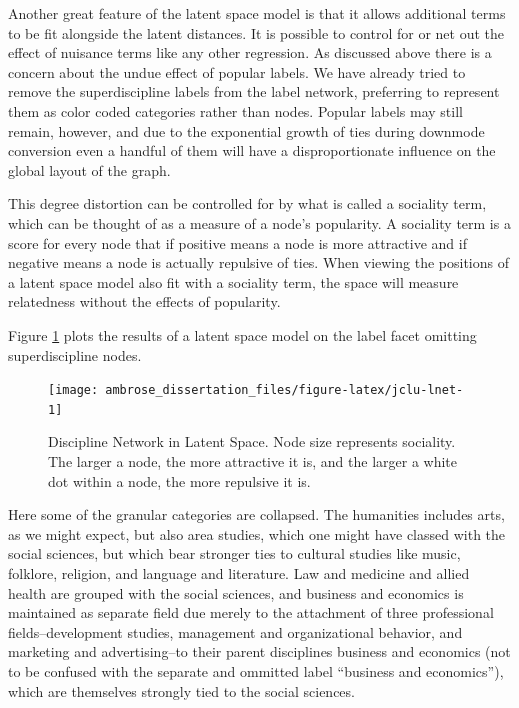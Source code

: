 \documentclass[]{book}
\begin{document}
Another great feature of the latent space model is that it allows
additional terms to be fit alongside the latent distances. It is
possible to control for or net out the effect of nuisance terms like any
other regression. As discussed above there is a concern about the undue
effect of popular labels. We have already tried to remove the
superdiscipline labels from the label network, preferring to represent
them as color coded categories rather than nodes. Popular labels may
still remain, however, and due to the exponential growth of ties during
downmode conversion even a handful of them will have a disproportionate
influence on the global layout of the graph.

This degree distortion can be controlled for by what is called a
sociality term, which can be thought of as a measure of a node's
popularity. A sociality term is a score for every node that if positive
means a node is more attractive and if negative means a node is actually
repulsive of ties. When viewing the positions of a latent space model
also fit with a sociality term, the space will measure relatedness
without the effects of popularity.

Figure \ref{fig:jclu-lnet} plots the results of a latent space model on
the label facet omitting superdiscipline nodes.

\begin{figure}

{\centering \texttt{[image: ambrose\_dissertation\_files/figure-latex/jclu-lnet-1]} 

}

\caption{Discipline Network in Latent Space. Node size represents sociality. The larger a node, the more attractive it is, and the larger a white dot within a node, the more repulsive it is.}\label{fig:jclu-lnet}
\end{figure}

Here some of the granular categories are collapsed. The humanities
includes arts, as we might expect, but also area studies, which one
might have classed with the social sciences, but which bear stronger
ties to cultural studies like music, folklore, religion, and language
and literature. Law and medicine and allied health are grouped with the
social sciences, and business and economics is maintained as separate
field due merely to the attachment of three professional
fields--development studies, management and organizational behavior, and
marketing and advertising--to their parent disciplines business and
economics (not to be confused with the separate and ommitted label
``business and economics''), which are themselves strongly tied to the
social sciences.
\end{document}
